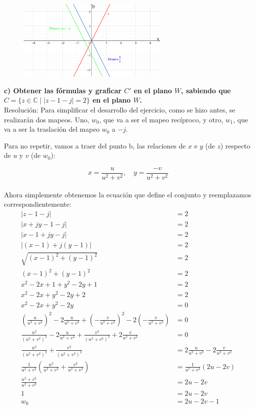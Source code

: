 \documentclass[12pt,a4paper]{report}
\begin{document}
\begin{figure}[h] %
    \centering %
    \includegraphics[width=0.65\textwidth]{./Imagenes/foto1Ej3.png} %
\end{figure}

\textbf{c) Obtener las fórmulas y graficar \( C' \) en el plano \( W \), sabiendo que \( C = \{z \in \mathbb{C} \mid |z - 1 - j| = 2\} \) en el plano \( W \).}\\[6pt]

Resolución: Para simplificar el desarrollo del ejercicio, como se hizo antes, se realizarán dos mapeos. Uno, \( w_0 \), que va a ser el mapeo recíproco, y otro, \( w_1 \), que va a ser la traslación del mapeo \( w_0 \) a \( -j \).

Para no repetir, vamos a traer del punto b, las relaciones de \( x \) e \( y \) (de \( z \)) respecto de \( u \) y \( v \) (de \( w_0 \)):

$$ x = \frac{u}{u^2 + v^2}, \quad y = \frac{-v}{u^2 + v^2} $$\\[6pt]
Ahora simplemente obtenemos la ecuación que define el conjunto y reemplazamos correspondientemente:\\
\begin{align*}
|z-1-j| &= 2 \\[6pt]
|x+jy-1-j|  &= 2 \\[6pt]
|x-1+jy-j| &= 2 \\[6pt]
|(x-1)+j(y-1)| &= 2 \\[6pt]
\sqrt{(x-1)^2 + (y-1)^2} &= 2 \\[6pt]
(x-1)^2 + (y-1)^2 &= 2 \\[6pt]
x^2 - 2x + 1 + y^2 - 2y + 1 &= 2 \\[6pt]
x^2 - 2x + y^2 - 2y + 2 &= 2 \\[6pt]
x^2 - 2x + y^2 - 2y &= 0 \\[6pt]
\left(\frac{u}{u^2+v^2} \right)^2 - 2\frac{u}{u^2+v^2} + \left( -\frac{v}{u^2+v^2} \right)^2-2 \left( -\frac{v}{u^2+v^2} \right) &=0\\[6pt]
\frac{u^2}{(u^2+v^2)^2}-2\frac{u}{u^2+v^2} + \frac{v^2}{(u^2+v^2)^2}+2\frac{v}{u^2+v^2}&=0\\[6pt]
\frac{u^2}{(u^2+v^2)^2}+\frac{v^2}{(u^2+v^2)^2}&=2\frac{u}{u^2+v^2} - 2 \frac{v}{u^2+v^2}\\[6pt]
\frac{1}{u^2+v^2} \left( \frac{u^2}{u^2+v^2} + \frac{v^2}{u^2+v^2} \right) &= \frac{1}{u^2+v^2}(2u-2v)\\[6pt]
\frac{u^2+v^2}{u^2+v^2}&=2u-2v\\[6pt]
1 &= 2u - 2v \\[6pt]
w_0 &= 2u - 2v - 1\\[6pt]
\end{align*}
 
\end{document}
